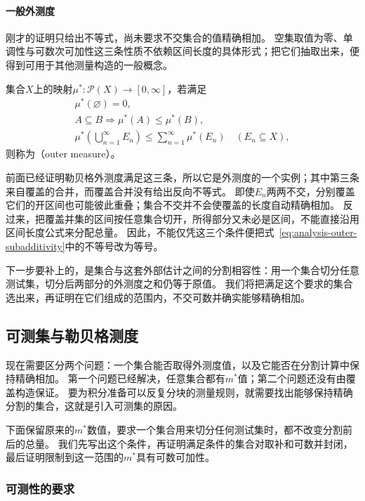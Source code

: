 \paragraph{一般外测度}

刚才的证明只给出不等式，尚未要求不交集合的值精确相加。
空集取值为零、单调性与可数次可加性这三条性质不依赖区间长度的具体形式；把它们抽取出来，便得到可用于其他测量构造的一般概念。
\begin{definition}[外测度]
\label{def:analysis-outer-measure}
集合$X$上的映射$\mu^*:\mathcal P(X)\to[0,\infty]$，若满足
\[
 \begin{gathered}
 \mu^*(\varnothing)=0,\\
 A\subseteq B\Longrightarrow\mu^*(A)\leq\mu^*(B),\\
 \mu^*\left(\bigcup_{n=1}^{\infty}E_n\right)\leq\sum_{n=1}^{\infty}\mu^*(E_n)
 \quad(E_n\subseteq X),
 \end{gathered}
\]
则称为（outer measure）。
\end{definition}
前面已经证明勒贝格外测度满足这三条，所以它是外测度的一个实例；其中第三条来自覆盖的合并，而覆盖合并没有给出反向不等式。
即使$E_n$两两不交，分别覆盖它们的开区间也可能彼此重叠；集合不交并不会使覆盖的长度自动精确相加。
反过来，把覆盖并集的区间按任意集合切开，所得部分又未必是区间，不能直接沿用区间长度公式来分配总量。
因此，不能仅凭这三个条件便把式~\eqref{eq:analysis-outer-subadditivity}中的不等号改为等号。

下一步要补上的，是集合与这套外部估计之间的分割相容性：用一个集合切分任意测试集，切分后两部分的外测度之和仍等于原值。
我们将把满足这个要求的集合选出来，再证明在它们组成的范围内，不交可数并确实能够精确相加。

\subsection{可测集与勒贝格测度}
\label{sec:analysis-lebesgue-measurable-construction}

现在需要区分两个问题：一个集合能否取得外测度值，以及它能否在分割计算中保持精确相加。
第一个问题已经解决，任意集合都有$m^*$值；第二个问题还没有由覆盖构造保证。
要为积分准备可以反复分块的测量规则，就需要找出能够保持精确分割的集合，这就是引入可测集的原因。

下面保留原来的$m^*$数值，要求一个集合用来切分任何测试集时，都不改变分割前后的总量。
我们先写出这个条件，再证明满足条件的集合对取补和可数并封闭，最后证明限制到这一范围的$m^*$具有可数可加性。

\subsubsection{可测性的要求}

